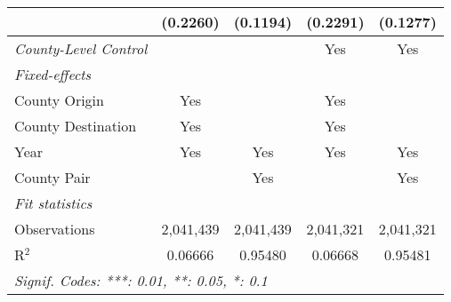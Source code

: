 \documentclass[letterpaper]{article}
\begin{document}
\begin{table}[H]
\begin{tabular}{lcccc}
                    & (0.2260)                & (0.1194)                & (0.2291)                & (0.1277)\\   
   \midrule
   \emph{County-Level Control } &                      &                         & Yes                     & Yes \\
   \midrule
   \emph{Fixed-effects}\\
   County Origin   & Yes                     &                         & Yes                     & \\  
   County Destination   & Yes                     &                         & Yes                     & \\  
   Year             & Yes                     & Yes                     & Yes                     & Yes\\  
   County Pair               &                         & Yes                     &                         & Yes\\  
   \midrule
   \emph{Fit statistics}\\
   Observations     & 2,041,439               & 2,041,439               & 2,041,321               & 2,041,321\\  
   R$^2$            & 0.06666                 & 0.95480                 & 0.06668                 & 0.95481\\  
   
   \midrule \midrule
   \multicolumn{5}{l}{\emph{Signif. Codes: ***: 0.01, **: 0.05, *: 0.1}}\\
\end{tabular}
\end{table}


\end{document}
